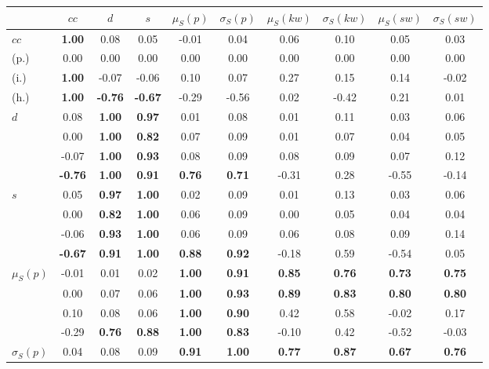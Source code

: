 \begin{table*}[h!]
\begin{center}
\begin{tabular}{| l || c | c | c | c | c | c | c | c | c |}\hline
 & $cc$ & $d$ & $s$ & $\mu_S(p)$ & $\sigma_S(p)$ & $\mu_S(kw)$ & $\sigma_S(kw)$ & $\mu_S(sw)$ & $\sigma_S(sw)$ \\\hline\hline
$cc$ & {\bf 1.00} & 0.08 & 0.05 & -0.01 & 0.04 & 0.06 & 0.10 & 0.05 & 0.03 \\
(p.) & 0.00  & 0.00  & 0.00  & 0.00  & 0.00  & 0.00  & 0.00  & 0.00  & 0.00 \\
(i.) & {\bf 1.00} & -0.07 & -0.06 & 0.10 & 0.07 & 0.27 & 0.15 & 0.14 & -0.02 \\
(h.) & {\bf 1.00} & {\bf -0.76} & {\bf -0.67} & -0.29 & -0.56 & 0.02 & -0.42 & 0.21 & 0.01 \\\hline
$d$ & 0.08 & {\bf 1.00} & {\bf 0.97} & 0.01 & 0.08 & 0.01 & 0.11 & 0.03 & 0.06 \\
 & 0.00 & {\bf 1.00} & {\bf 0.82} & 0.07 & 0.09 & 0.01 & 0.07 & 0.04 & 0.05 \\
 & -0.07 & {\bf 1.00} & {\bf 0.93} & 0.08 & 0.09 & 0.08 & 0.09 & 0.07 & 0.12 \\
 & {\bf -0.76} & {\bf 1.00} & {\bf 0.91} & {\bf 0.76} & {\bf 0.71} & -0.31 & 0.28 & -0.55 & -0.14 \\\hline
$s$ & 0.05 & {\bf 0.97} & {\bf 1.00} & 0.02 & 0.09 & 0.01 & 0.13 & 0.03 & 0.06 \\
 & 0.00 & {\bf 0.82} & {\bf 1.00} & 0.06 & 0.09 & 0.00 & 0.05 & 0.04 & 0.04 \\
 & -0.06 & {\bf 0.93} & {\bf 1.00} & 0.06 & 0.09 & 0.06 & 0.08 & 0.09 & 0.14 \\
 & {\bf -0.67} & {\bf 0.91} & {\bf 1.00} & {\bf 0.88} & {\bf 0.92} & -0.18 & 0.59 & -0.54 & 0.05 \\\hline
$\mu_S(p)$ & -0.01 & 0.01 & 0.02 & {\bf 1.00} & {\bf 0.91} & {\bf 0.85} & {\bf 0.76} & {\bf 0.73} & {\bf 0.75} \\
 & 0.00 & 0.07 & 0.06 & {\bf 1.00} & {\bf 0.93} & {\bf 0.89} & {\bf 0.83} & {\bf 0.80} & {\bf 0.80} \\
 & 0.10 & 0.08 & 0.06 & {\bf 1.00} & {\bf 0.90} & 0.42 & 0.58 & -0.02 & 0.17 \\
 & -0.29 & {\bf 0.76} & {\bf 0.88} & {\bf 1.00} & {\bf 0.83} & -0.10 & 0.42 & -0.52 & -0.03 \\\hline
$\sigma_S(p)$ & 0.04 & 0.08 & 0.09 & {\bf 0.91} & {\bf 1.00} & {\bf 0.77} & {\bf 0.87} & {\bf 0.67} & {\bf 0.76} \\

\end{tabular}
\end{center}
\end{table*}
